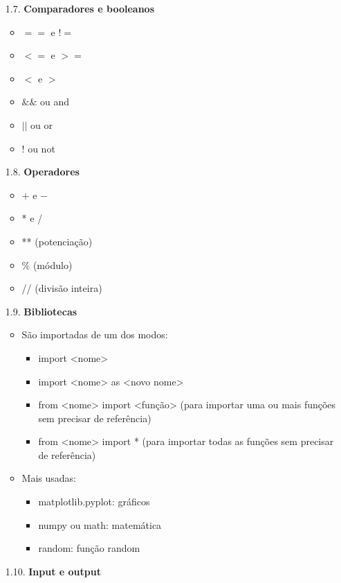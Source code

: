 \documentclass[12pt, a4paper]{article} %
\begin{document}
\begin{enumerate}
\begin{enumerate}
\begin{enumerate}
\begin{itemize}
\setlength{\parindent}{1cm} (O que cada loop faz)
\end{itemize}
\item[1.6.3.] \textbf{Outros}
\begin{itemize}
\item 
\end{itemize}
\end{enumerate}
\item[1.7.] \textbf{Comparadores e booleanos}
\begin{itemize}
\item $==$ e !$=$
\item $<=$ e $>=$
\item $<$ e $>$
\item $\&\&$ ou and
\item $||$ ou or
\item  ! ou not
\end{itemize}
\item[1.8.] \textbf{Operadores}
\begin{itemize}
\item $+$ e $-$
\item * e /
\item ** (potenciação)
\item \% (módulo)
\item // (divisão inteira)
\end{itemize}
\item[1.9.] \textbf{Bibliotecas}
\begin{itemize}
\item São importadas de um dos modos:
\begin{itemize}
\item import <nome>
\item import <nome> as <novo nome>
\item from <nome> import <função> (para importar uma ou mais funções sem precisar de referência)
\item from <nome> import * (para importar todas as funções sem precisar de referência)
\end{itemize}
\item Mais usadas:
\begin{itemize}
\item matplotlib.pyplot: gráficos
\item numpy ou math: matemática
\item random: função random
\end{itemize}
\end{itemize}
\item[1.10.] \textbf{Input e output}

\end{enumerate}
\end{enumerate}
\end{document}
